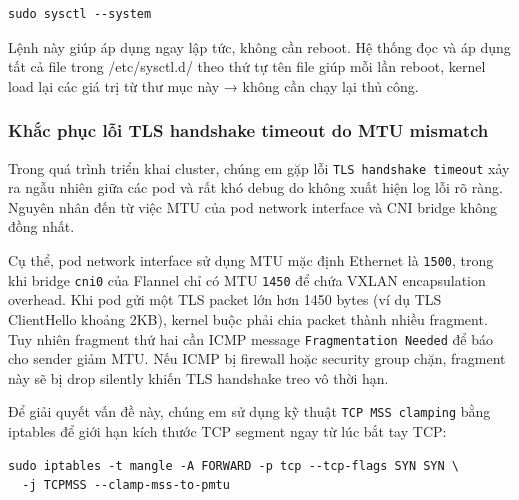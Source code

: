 \begin{verbatim}
sudo sysctl --system
\end{verbatim}
Lệnh này giúp áp dụng ngay lập tức, không cần reboot. Hệ thống đọc và áp dụng tất cả file trong /etc/sysctl.d/ theo thứ tự tên file giúp mỗi lần reboot, kernel load lại các giá trị từ thư mục này → không cần chạy lại thủ công.

\subsubsection{Khắc phục lỗi TLS handshake timeout do MTU mismatch}

Trong quá trình triển khai cluster, chúng em gặp lỗi \texttt{TLS handshake timeout} xảy ra ngẫu nhiên giữa các pod và rất khó debug do không xuất hiện log lỗi rõ ràng. Nguyên nhân đến từ việc MTU của pod network interface và CNI bridge không đồng nhất.

Cụ thể, pod network interface sử dụng MTU mặc định Ethernet là \texttt{1500}, trong khi bridge \texttt{cni0} của Flannel chỉ có MTU \texttt{1450} để chứa VXLAN encapsulation overhead. Khi pod gửi một TLS packet lớn hơn 1450 bytes (ví dụ TLS ClientHello khoảng 2KB), kernel buộc phải chia packet thành nhiều fragment. Tuy nhiên fragment thứ hai cần ICMP message \texttt{Fragmentation Needed} để báo cho sender giảm MTU. Nếu ICMP bị firewall hoặc security group chặn, fragment này sẽ bị drop silently khiến TLS handshake treo vô thời hạn.

Để giải quyết vấn đề này, chúng em sử dụng kỹ thuật \texttt{TCP MSS clamping} bằng iptables để giới hạn kích thước TCP segment ngay từ lúc bắt tay TCP:

\begin{verbatim}
sudo iptables -t mangle -A FORWARD -p tcp --tcp-flags SYN SYN \
  -j TCPMSS --clamp-mss-to-pmtu
\end{verbatim}

